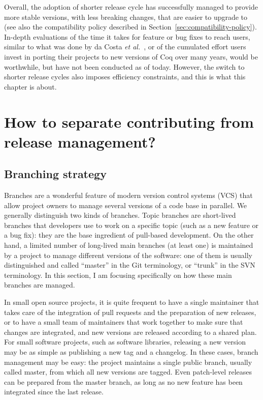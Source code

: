 Overall, the adoption of shorter release cycle has successfully managed to provide more stable versions, with less breaking changes, that are easier to upgrade to (see also the compatibility policy described in Section~\ref{sec:compatibility-policy}).
In-depth evaluations of the time it takes for feature or bug fixes to reach users, similar to what was done by da Costa \emph{et al.}~\cite{da2018impact}, or of the cumulated effort users invest in porting their projects to new versions of Coq over many years, would be worthwhile, but have not been conducted as of today.
However, the switch to shorter release cycles also imposes efficiency constraints, and this is what this chapter is about.

\section{How to separate contributing from release management?}

\subsection{Branching strategy}

Branches are a wonderful feature of modern version control systems (VCS) that allow project owners to manage several versions of a code base in parallel.
We generally distinguish two kinds of branches.
Topic branches are short-lived branches that developers use to work on a specific topic (such as a new feature or a bug fix): they are the base ingredient of pull-based development.
On the other hand, a limited number of long-lived main branches (at least one) is maintained by a project to manage different versions of the software: one of them is usually distinguished and called ``master'' in the Git terminology, or ``trunk'' in the SVN terminology.
In this section, I am focusing specifically on how these main branches are managed.

In small open source projects, it is quite frequent to have a single maintainer that takes care of the integration of pull requests and the preparation of new releases, or to have a small team of maintainers that work together to make sure that changes are integrated, and new versions are released according to a shared plan.
For small software projects, such as software libraries, releasing a new version may be as simple as publishing a new tag and a changelog.
In these cases, branch management may be easy: the project maintains a single public branch, usually called master, from which all new versions are tagged.
Even patch-level releases can be prepared from the master branch, as long as no new feature has been integrated since the last release.

